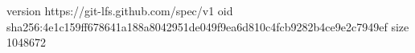 version https://git-lfs.github.com/spec/v1
oid sha256:4e1c159ff678641a188a8042951de049f9ea6d810c4fcb9282b4ce9e2c7949ef
size 1048672
